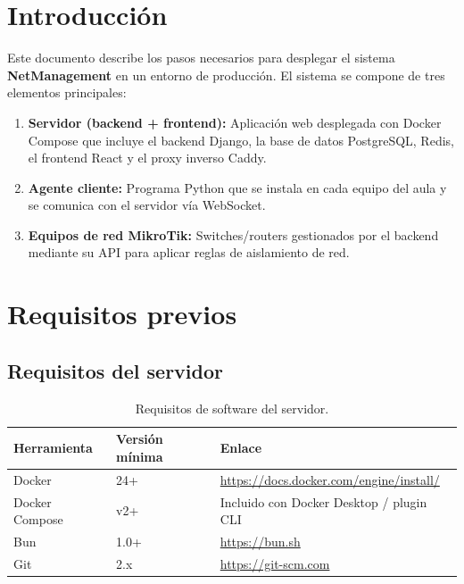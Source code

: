 \documentclass[12pt,a4paper]{article}
\begin{document}
\section{Introducción}

Este documento describe los pasos necesarios para desplegar el sistema \textbf{NetManagement} en un entorno de producción. El sistema se compone de tres elementos principales:

\begin{enumerate}
    \item \textbf{Servidor (backend + frontend):} Aplicación web desplegada con Docker Compose que incluye el backend Django, la base de datos PostgreSQL, Redis, el frontend React y el proxy inverso Caddy.
    \item \textbf{Agente cliente:} Programa Python que se instala en cada equipo del aula y se comunica con el servidor vía WebSocket.
    \item \textbf{Equipos de red MikroTik:} Switches/routers gestionados por el backend mediante su API para aplicar reglas de aislamiento de red.
\end{enumerate}

\section{Requisitos previos}

\subsection{Requisitos del servidor}

\begin{table}[H]
\centering
\begin{tabularx}{\textwidth}{lll}
    \toprule
    \textbf{Herramienta} & \textbf{Versión mínima} & \textbf{Enlace} \\
    \midrule
    Docker         & 24+   & \url{https://docs.docker.com/engine/install/} \\
    Docker Compose & v2+   & Incluido con Docker Desktop / plugin CLI \\
    Bun            & 1.0+  & \url{https://bun.sh} \\
    Git            & 2.x   & \url{https://git-scm.com} \\
    \bottomrule
\end{tabularx}
\caption{Requisitos de software del servidor.}
\end{table}
\end{document}
